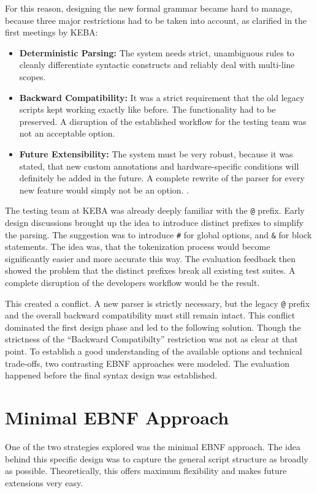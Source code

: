 For this reason, designing the new formal grammar became hard to manage, because three major restrictions had to be taken into account, as clarified in the first meetings by KEBA:
\begin{itemize}
    \item \textbf{Deterministic Parsing:} The system needs strict, unambiguous rules to cleanly differentiate syntactic constructs and reliably deal with multi-line scopes. 
    \item \textbf{Backward Compatibility:} It was a strict requirement that the old legacy scripts kept working exactly like before. The functionality had to be preserved. A disruption of the established workflow for the testing team was not an acceptable option.
    \item \textbf{Future Extensibility:} The system must be very robust, because it was stated, that new custom annotations and hardware-specific conditions will definitely be added in the future. A complete rewrite of the parser for every new feature would simply not be an option.
.
\end{itemize}
The testing team at KEBA was already deeply familiar with the \texttt{@} prefix. Early design discussions brought up the idea to introduce distinct prefixes to simplify the parsing. The suggestion was to introduce \texttt{\#} for global options, and \texttt{\&} for block statements. The idea was, that the tokenization process would become significantly easier and more accurate this way. The evaluation feedback then showed the problem that the distinct prefixes break all existing test suites. A complete disruption of the developers workflow would be the result.

 This created a conflict. A new parser is strictly necessary, but the legacy \texttt{@} prefix and the overall backward compatibility must still remain intact. This conflict dominated the first design phase and led to the following solution. Though the strictness of the ``Backward Compatibilty'' restriction was not as clear at that point.
 To establish a good understanding of the available options and technical trade-offs, two contrasting EBNF approaches were modeled. The evaluation happened before the final syntax design was established.


\section{Minimal EBNF Approach}

One of the two strategies explored was the minimal EBNF approach. The idea behind this specific design was to capture the general script structure as broadly as possible. Theoretically, this offers maximum flexibility and makes future extensions very easy.

